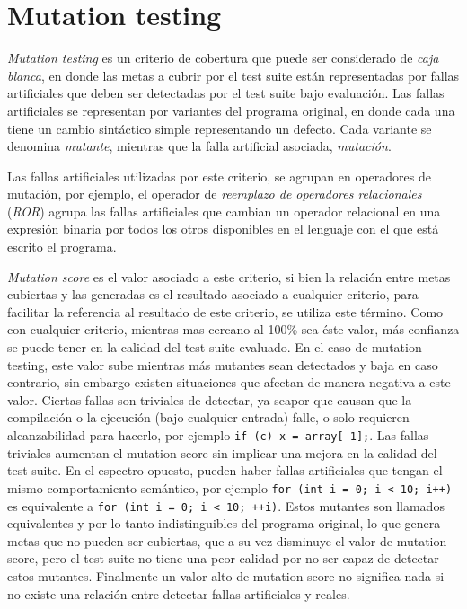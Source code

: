 \chapter[Mutation]{Mutation testing}
\label{sec:preliminares.mutation}

\emph{Mutation testing} es un criterio de cobertura que puede ser considerado de \emph{caja blanca}, en donde las metas a cubrir por el test suite est\'an representadas por fallas artificiales que deben ser detectadas por el test suite bajo evaluaci\'on. Las fallas artificiales se representan por variantes del programa original, en donde cada una tiene un cambio sint\'actico simple representando un defecto. Cada variante se denomina \emph{mutante}, mientras que la falla artificial asociada, \emph{mutaci\'on}.

Las fallas artificiales utilizadas por este criterio, se agrupan en operadores de mutaci\'on, por ejemplo, el operador de \emph{reemplazo de operadores relacionales} (\emph{ROR}) agrupa las fallas artificiales que cambian un operador relacional en una expresi\'on binaria por todos los otros disponibles en el lenguaje con el que est\'a escrito el programa.

\emph{Mutation score} es el valor asociado a este criterio, si bien la relaci\'on entre metas cubiertas y las generadas es el resultado asociado a cualquier criterio, para facilitar la referencia al resultado de este criterio, se utiliza este t\'ermino. Como con cualquier criterio, mientras mas cercano al 100\% sea \'este valor, m\'as confianza se puede tener en la calidad del test suite evaluado. En el caso de mutation testing, este valor sube mientras m\'as mutantes sean detectados y baja en caso contrario, sin embargo existen situaciones que afectan de manera negativa a este valor. Ciertas fallas son triviales de detectar, ya seapor que causan que la compilaci\'on o la ejecuci\'on (bajo cualquier entrada) falle, o solo requieren alcanzabilidad para hacerlo, por ejemplo \lstinline|if (c) x = array[-1];|. Las fallas triviales aumentan el mutation score sin implicar una mejora en la calidad del test suite. En el espectro opuesto, pueden haber fallas artificiales que tengan el mismo comportamiento sem\'antico, por ejemplo \lstinline|for (int i = 0; i < 10; i++)| es equivalente a \lstinline|for (int i = 0; i < 10; ++i)|. Estos mutantes son llamados equivalentes y por lo tanto indistinguibles del programa original, lo que genera metas que no pueden ser cubiertas, que a su vez disminuye el valor de mutation score, pero el test suite no tiene una peor calidad por no ser capaz de detectar estos mutantes. Finalmente un valor alto de mutation score no significa nada si no existe una relaci\'on entre detectar fallas artificiales y reales.

